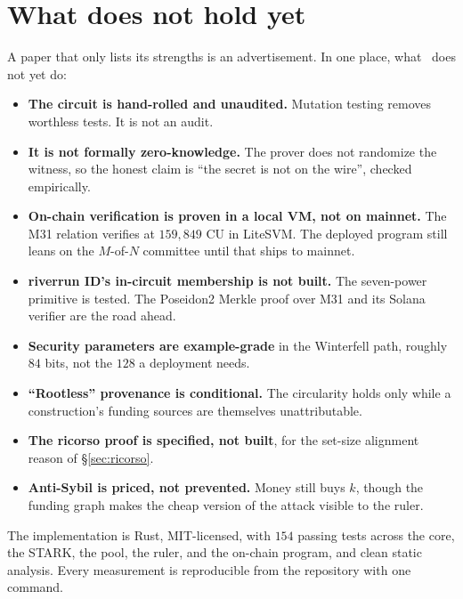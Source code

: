 \documentclass[11pt]{article}
\begin{document}
\section{What does not hold yet}
\label{sec:limits}

A paper that only lists its strengths is an advertisement. In one place, what \river\
does not yet do:

\begin{itemize}[leftmargin=1.4em,itemsep=0.2em]
\item \textbf{The circuit is hand-rolled and unaudited.} Mutation testing removes
      worthless tests. It is not an audit.
\item \textbf{It is not formally zero-knowledge.} The prover does not randomize the
      witness, so the honest claim is ``the secret is not on the wire'', checked
      empirically.
\item \textbf{On-chain verification is proven in a local VM, not on mainnet.} The M31
      relation verifies at $159{,}849$ CU in LiteSVM. The deployed program still leans on
      the $M$-of-$N$ committee until that ships to mainnet.
\item \textbf{riverrun ID's in-circuit membership is not built.} The seven-power
      primitive is tested. The Poseidon2 Merkle proof over M31 and its Solana verifier
      are the road ahead.
\item \textbf{Security parameters are example-grade} in the Winterfell path, roughly
      $84$ bits, not the $128$ a deployment needs.
\item \textbf{``Rootless'' provenance is conditional.} The circularity holds only while a
      construction's funding sources are themselves unattributable.
\item \textbf{The ricorso proof is specified, not built}, for the set-size alignment
      reason of \S\ref{sec:ricorso}.
\item \textbf{Anti-Sybil is priced, not prevented.} Money still buys $k$, though the
      funding graph makes the cheap version of the attack visible to the ruler.
\end{itemize}

The implementation is Rust, MIT-licensed, with $154$ passing tests across the core, the
STARK, the pool, the ruler, and the on-chain program, and clean static analysis. Every
measurement is reproducible from the repository with one command.

\end{document}
